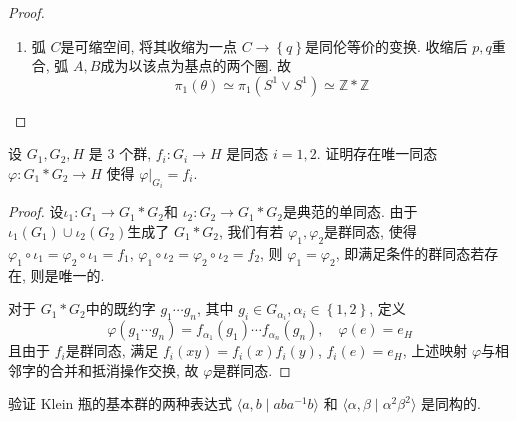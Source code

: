 \documentclass[../main.tex]{subfiles}
\begin{document}
\begin{proof}
\begin{enumerate}
\begin{center}
\end{center}

故 \[
 \pi _1 \left( T^{2}\setminus \left\{ p_1,p_2,p_3 \right\} \right) \simeq  \pi _1 \left( S^{1}\vee S^{1}\vee  S^{1}\vee  S^{1} \right)\simeq \mathbb{Z} *\mathbb{Z} *\mathbb{Z} *\mathbb{Z}   
\]

\item 弧 \(  C  \)是可缩空间, 将其收缩为一点 \(  C\to \left\{ q \right\}  \)是同伦等价的变换. 收缩后 \(  p,q  \)重合, 弧 \(  A,B  \)成为以该点为基点的两个圈. 故 \[
 \pi _1 \left(  \theta  \right)\simeq  \pi _1 \left( S^{1}\vee S^{1} \right)\simeq \mathbb{Z} *\mathbb{Z}   
\]    
    \end{enumerate}
   
\end{proof}

\begin{exercise}{}{}
设 \(G_1,G_2,H\) 是 \(3\) 个群, \(f_i:G_i\to H\) 是同态 \(i=1,2\). 证明存在唯一同态 \(\varphi:G_1*G_2\to H\) 使得 \(\varphi|_{G_i}=f_i\).
\end{exercise}

\begin{proof}
   设\(  \iota _1 :G_1\to G_1*G_2  \)和 \(  \iota _2 :G_2\to G_1*G_2  \)是典范的单同态.  由于 \(  \iota_1 \left( G_1 \right)  \cup   \iota_2\left( G_2 \right)  \)生成了 \(  G_1*G_2  \), 我们有若 \(   \varphi _1 , \varphi _2   \)是群同态, 使得 \(   \varphi _1 \circ \iota _1 =  \varphi _2 \circ \iota _1 = f_1  \), \(   \varphi _1 \circ \iota _2 =  \varphi _2 \circ \iota _2  = f_2 \), 则 \(   \varphi _1 =  \varphi _2   \), 即满足条件的群同态若存在, 则是唯一的.
   
   
   对于 \(  G_1*G_2  \)中的既约字 \(  g_1\cdots g_{n}  \), 其中 \(  g_{i}\in G_{\alpha _{i}}, \alpha _{i}\in \left\{ 1,2 \right\}  \), 定义 \[
    \varphi \left( g_1\cdots g_{n} \right)= f_{\alpha _{1}}\left( g_1 \right)\cdots f_{\alpha _{n}}\left( g_{n} \right)   ,\quad  \varphi \left( e \right)= e_{H} 
   \]   
   且由于 \(  f_{i}  \)是群同态, 满足 \(  f_{i}\left( xy \right)= f_{i}\left( x \right)f_{i}\left( y \right)     \), \(  f_{i}\left( e \right)= e_{H}   \), 上述映射 \(   \varphi   \)与相邻字的合并和抵消操作交换, 故 \(   \varphi   \)是群同态.    
\end{proof}

\begin{exercise}{}{}
验证 Klein 瓶的基本群的两种表达式 \(\langle a,b\mid aba^{-1}b\rangle\) 和 \(\langle \alpha,\beta\mid \alpha^2\beta^2\rangle\) 是同构的.
\end{exercise}
\end{document}
